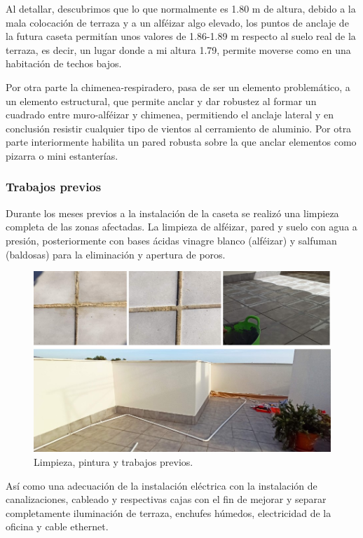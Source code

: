 Al detallar, descubrimos que lo que normalmente es 1.80 m de altura, debido a la mala colocación de terraza y a un alféizar algo elevado, los puntos de anclaje de la futura caseta permitían unos valores de 1.86-1.89 m respecto al suelo real de la terraza, es decir, un lugar donde a mi altura 1.79, permite moverse como en una habitación de techos bajos. 

Por otra parte la chimenea-respiradero, pasa de ser un elemento problemático, a un elemento estructural, que permite anclar y dar robustez al formar un cuadrado entre muro-alféizar y chimenea, permitiendo el anclaje lateral y en conclusión resistir cualquier tipo de vientos al cerramiento de aluminio. Por otra parte interiormente habilita un pared robusta sobre la  que anclar elementos como pizarra o mini estanterías.

\subsubsection{Trabajos previos}\label{S:trabajos_previos}
Durante los meses previos a la instalación de la caseta se realizó una limpieza completa de las zonas afectadas. La limpieza de alféizar, pared y suelo con agua a presión, posteriormente con bases ácidas vinagre blanco (alféizar) y salfuman (baldosas) para la eliminación y apertura de poros.

\begin{figure}[!htb]
\begin{center}
\includegraphics[width=1\textwidth]{./figuras/trabajos_previos.jpg}
\caption{Limpieza, pintura y trabajos previos.}
\label{F:trabajos_previos}
\end{center}
\end{figure}

Así como una adecuación de la instalación eléctrica con la instalación de canalizaciones, cableado y respectivas cajas con el fin de mejorar y separar completamente iluminación de terraza, enchufes húmedos, electricidad de la oficina y cable ethernet.

